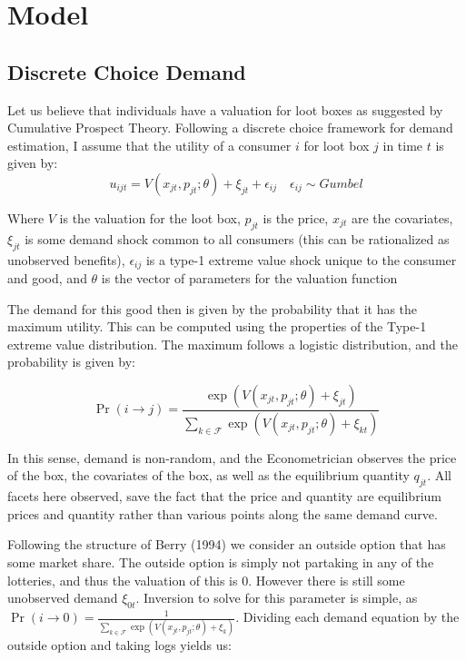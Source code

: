 \documentclass[12pt]{paper}
\begin{document}
\section{Model}

\subsection{Discrete Choice Demand}

Let us believe that individuals have a valuation for loot boxes as
suggested by Cumulative Prospect Theory. Following a discrete choice
framework for demand estimation, I assume that the utility of a
consumer $i$ for loot box $j$ in time $t$ is given by:
\begin{equation*}
  u_{ijt} = V( x_{jt}, p_{jt}; \theta ) + \xi_{jt} + \epsilon_{ij} \quad \epsilon_{ij} \sim Gumbel
\end{equation*}

Where $V$ is the valuation for the loot box, $p_{jt}$ is the price,
$x_{jt}$ are the covariates, $\xi_{jt}$ is some demand shock common to
all consumers (this can be rationalized as unobserved benefits), 
$\epsilon_{ij}$ is a type-1 extreme value shock unique to the consumer and
good, and $\theta$ is the vector of parameters for the valuation function

The demand for this good then is given by the probability that it has
the maximum utility. This can be computed using the properties of the
Type-1 extreme value distribution. The maximum follows a logistic
distribution, and the probability is given by:

\begin{equation*}
  \Pr( i \rightarrow j ) = \frac{\exp( V(x_{jt},p_{jt} ; \theta) + \xi_{jt})}{ \sum_{k \in \mathcal{F}}
    \exp(V(x_{jt},p_{jt}; \theta) + \xi_{kt})}
\end{equation*}

In this sense, demand is non-random, and the Econometrician observes
the price of the box, the covariates of the box, as well as the
equilibrium quantity $q_{jt}$. All facets here observed, save the fact
that the price and quantity are equilibrium prices and quantity rather
than various points along the same demand curve.

Following the structure of Berry (1994) we consider an outside option
that has some market share. The outside option is simply not partaking
in any of the lotteries, and thus the valuation of this is $0$.
However there is still some unobserved demand $\xi_{0t}$. Inversion to
solve for this parameter is simple, as
$\Pr( i \rightarrow 0) = \frac{1}{ \sum_{k \in \mathcal{F}} \exp(V(x_{jt},p_{jt}; \theta) +
  \xi_k)}$.  Dividing each demand equation by the outside option and
taking logs yields us:
\end{document}
